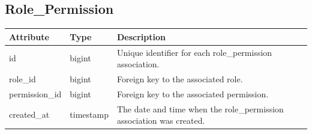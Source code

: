 \documentclass{scrreprt}
\begin{document}
\subsection*{Role\_Permission}
\begin{tabular}{|m{2.5cm}|m{2.5cm}|m{6cm}|}
\hline
\textbf{Attribute} & \textbf{Type} & \textbf{Description} \\
\hline
id & bigint & Unique identifier for each role\_permission association. \\
\hline
role\_id & bigint & Foreign key to the associated role. \\
\hline
permission\_id & bigint & Foreign key to the associated permission. \\
\hline
created\_at & timestamp & The date and time when the role\_permission association was created. \\
\hline
\end{tabular}

\end{document}
